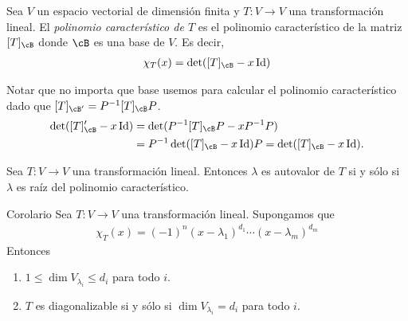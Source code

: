\documentclass{beamer} %
\newcommand{\Id}{\operatorname{Id}}
\begin{document}
\begin{frame}
    
    \begin{definicion}
        Sea $V$ un espacio vectorial de dimensión finita y $T:V\longrightarrow V$ una transformación lineal.
        El \textit{polinomio característico de $T$} es el polinomio característico de la matriz $[T]_\cB$ donde $\cB$ es una base de $V$. Es decir,
        \begin{align*}
            \chi_T(x)=\det([T]_\cB-x\Id) 
        \end{align*}
    \end{definicion}\pause
    
    \begin{observacion}
        Notar que no importa que base usemos para calcular el polinomio característico dado que $[T]_{\cB'}=P^{-1}[T]_{\cB}P$.
        \begin{align*}
        \det([T]_\cB'-x\Id)  &= \det(P^{-1}[T]_\cB P-xP^{-1}P) \\
        &= P^{-1}\det([T]_\cB -x\Id)P = \det([T]_\cB-x\Id). 
        \end{align*}
    \end{observacion}
    
\end{frame}

\begin{frame}
    \begin{proposicion}
        Sea $T:V\longrightarrow V$ una transformación lineal. Entonces
        $\lambda$ es autovalor de $T$ si y sólo si $\lambda$ es raíz del polinomio característico.
    \end{proposicion}\pause
    
    \begin{block}{Corolario}
        Sea $T:V\longrightarrow V$ una transformación lineal. Supongamos que 
        \begin{align*}
            \chi_T(x)=(-1)^n (x-\lambda_1)^{d_1}\cdots (x-\lambda_m)^{d_m}
        \end{align*}
        Entonces 
        \begin{enumerate}
            \item $1\leq\dim V_{\lambda_i}\leq d_i$ para todo $i$.
            \item $T$ es diagonalizable si y sólo si $\dim V_{\lambda_i}=d_i$ para todo $i$.
        \end{enumerate}
    \end{block}
\end{frame}
\end{document}
